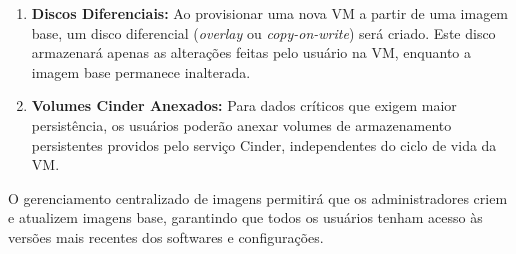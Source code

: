 \begin{enumerate}
 \item \textbf{Discos Diferenciais:} Ao provisionar uma nova VM a partir de uma imagem base, um disco diferencial (\textit{overlay} ou \textit{copy-on-write}) será criado. Este disco armazenará apenas as alterações feitas pelo usuário na VM, enquanto a imagem base permanece inalterada.
 \item \textbf{Volumes Cinder Anexados:} Para dados críticos que exigem maior persistência, os usuários poderão anexar volumes de armazenamento persistentes providos pelo serviço Cinder, independentes do ciclo de vida da VM.
\end{enumerate}

O gerenciamento centralizado de imagens permitirá que os administradores criem e atualizem imagens base, garantindo que todos os usuários tenham acesso às versões mais recentes dos softwares e configurações.
